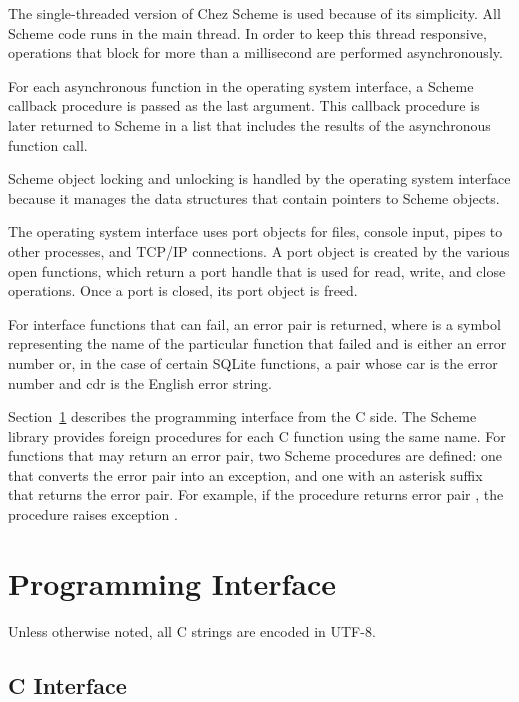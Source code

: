 The single-threaded version of Chez Scheme is used because of its
simplicity. All Scheme code runs in the main thread. In order to keep
this thread responsive, operations that block for more than a
millisecond are performed asynchronously.

For each asynchronous function in the operating system interface, a
Scheme callback procedure is passed as the last argument.  This
callback procedure is later returned to Scheme in a list that includes
the results of the asynchronous function call.

Scheme object locking and unlocking is handled by the operating system
interface because it manages the data structures that contain pointers
to Scheme objects.

The operating system interface uses port objects for files, console
input, pipes to other processes, and TCP/IP connections. A port object
is created by the various open functions, which return a port handle
that is used for read, write, and close operations. Once a port is
closed, its port object is freed.

For interface functions that can fail, an error pair
 is returned, where  is a
symbol representing the name of the particular function that failed
and  is either an error number or, in the case of certain
SQLite functions, a pair whose car is the error number and cdr is the
English error string.

Section~\ref{sec:osi-api} describes the programming interface from the
C side. The Scheme library  provides foreign procedures
for each C function using the same name. For functions that may return
an error pair, two Scheme procedures are defined: one that converts
the error pair into an exception, and one with an asterisk suffix that
returns the error pair. For example, if the 
procedure returns error pair , the
 procedure raises exception .

\section {Programming Interface}\label{sec:osi-api}

Unless otherwise noted, all C strings are encoded in UTF-8.

\subsection {C Interface}

